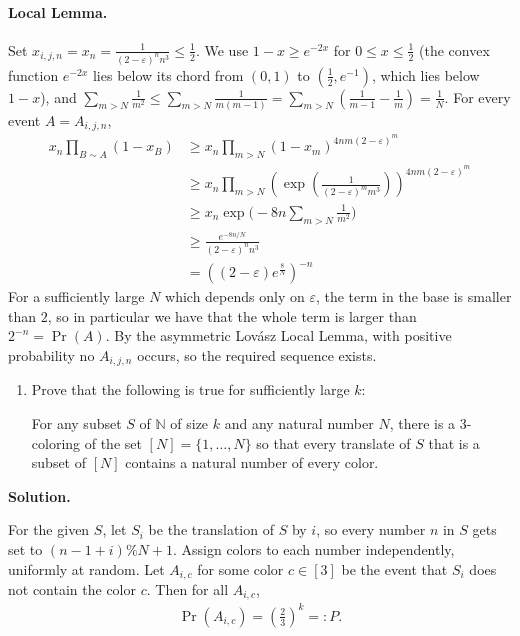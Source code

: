 \documentclass[11pt,letterpaper]{article}
\theoremstyle{definition}
\newcommand{\solution}{\medskip\noindent\textbf{Solution.}\par\medskip}
\begin{document}
\paragraph{Local Lemma.}
Set $x_{i,j,n}=x_n=\frac{1}{(2-\varepsilon)^n n^3}\leq\frac12$.
We use $1-x\geq e^{-2x}$ for $0\leq x\leq\frac12$ (the convex function $e^{-2x}$ lies below its chord from $(0,1)$ to $(\frac12,e^{-1})$, which lies below $1-x$), and $\sum_{m>N}\frac{1}{m^2}\leq\sum_{m>N}\frac{1}{m(m-1)}=\sum_{m>N}\left(\frac{1}{m-1}-\frac{1}{m}\right)=\frac1N$.
For every event $A=A_{i,j,n}$,
\begin{align*}
    x_n\prod_{B\sim A}(1-x_B)
    &\geq x_n\prod_{m>N}(1-x_m)^{4nm(2-\varepsilon)^m} \\
    &\geq x_n\prod_{m>N}(\exp(\frac{1}{(2-\varepsilon)^mm^3}))^{4nm(2-\varepsilon)^m} \\
    &\geq x_n\exp\Big(-8n\sum_{m>N}\frac{1}{m^2}\Big) \\
    &\geq \frac{e^{-8n/N}}{(2-\varepsilon)^n n^3} \\
    &=\left((2-\varepsilon)e^\frac{8}{N}\right)^{-n} 
\end{align*}
For a sufficiently large $N$ which depends only on $\varepsilon$, the term in the base is smaller than $2$, so in particular we have that the whole term is larger than $2^{-n}=\Pr(A)$.
By the asymmetric Lov\'asz Local Lemma, with positive probability no $A_{i,j,n}$ occurs, so the required sequence exists.


\begin{enumerate}[resume=q]
\item Prove that the following is true for sufficiently large $k$:

For any subset $S$ of $\mathbb{N}$ of size $k$ and any natural number $N$, there is a $3$-coloring of the set $[N] = \{1,\dots,N\}$ so that every translate of $S$ that is a subset of $[N]$ contains a natural number of every color.
\end{enumerate}

\solution

For the given $S$, let $S_i$ be the translation of $S$ by $i$, so every number $n$ in $S$ gets set to $(n-1+i)\% N +1$.
Assign colors to each number independently, uniformly at random.
Let $A_{i,c}$ for some color $c\in [3]$ be the event that $S_i$ does not contain the color $c$.
Then for all $A_{i,c}$,
\begin{align*}
    \Pr(A_{i,c}) = \left(\frac{2}{3}\right)^k =: P.
\end{align*}
\end{document}
